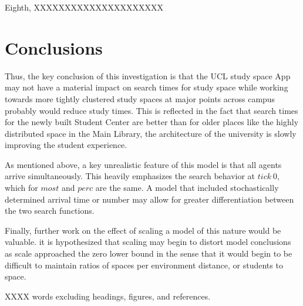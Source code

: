 \documentclass[11pt]{article} %
\begin{document}
Eighth, XXXXXXXXXXXXXXXXXXXXX



\section{Conclusions}

Thus, the key conclusion of this investigation is that the UCL study space App may not have a material impact on search times for study space while working towards more tightly clustered study spaces at major points across campus probably would reduce study times. This is reflected in the fact that search times for the newly built Student Center are better than for older places like the highly distributed space in the Main Library, the architecture of the university is slowly improving the student experience. 


As mentioned above, a key unrealistic feature of this model is that all agents arrive simultaneously. This heavily emphasizes the search behavior at $tick \: 0$, which for $most$ and $perc$ are the same. A model that included stochastically determined arrival time or number may allow for greater differentiation between the two search functions. 

Finally, further work on the effect of scaling a model of this nature would be valuable. it is hypothesized that scaling may begin to distort model conclusions as scale approached the zero lower bound in the sense that it would begin to be difficult to maintain ratios of spaces per environment distance, or students to space.  


XXXX words excluding headings, figures, and references. \\

\nocite{*}

\medskip


\printbibliography
\end{document}
